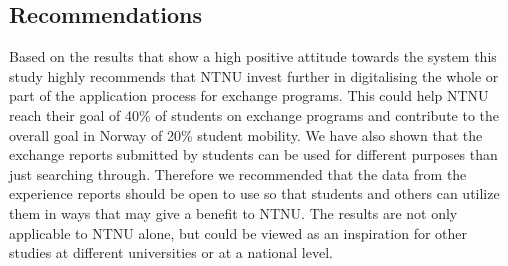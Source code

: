 \subsection{Recommendations}
Based on the results that show a high positive attitude towards the system this study highly recommends that NTNU invest further in digitalising the whole or part of the application process for exchange programs. This could help NTNU reach their goal of 40\% of students on exchange programs and contribute to the overall goal in Norway of 20\% student mobility. We have also shown that the exchange reports submitted by students can be used for different purposes than just searching through. Therefore we recommended that the data from the experience reports should be open to use so that students and others can utilize them in ways that may give a benefit to NTNU. The results are not only applicable to NTNU alone, but could be viewed as an inspiration for other studies at different universities or at a national level. 



\cleardoublepage